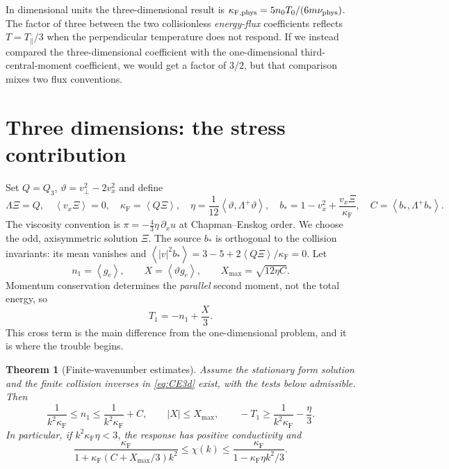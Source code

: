 \documentclass[11pt]{article}
\newcommand{\av}[1]{\left\langle #1\right\rangle}
\newcommand{\F}{\kappa_{\mathrm F}}
\newcommand{\dual}[1]{\left\langle #1,\Lambda^+ #1\right\rangle}
\newtheorem{theorem}{Theorem}[section]
\theoremstyle{definition}
\theoremstyle{remark}
\numberwithin{equation}{section}
\begin{document}
In dimensional units the three-dimensional result is
$\kappa_{\mathrm{F,phys}}=5n_0T_0/(6m\nu_{\rm phys})$.
The factor of three between the two collisionless \emph{energy-flux}
coefficients reflects $T=T_\parallel/3$ when the perpendicular
temperature does not respond. If we instead compared the
three-dimensional coefficient with the one-dimensional
third-central-moment coefficient, we would get a factor of $3/2$, but
that comparison mixes two flux conventions.

\section{Three dimensions: the stress contribution}\label{sec:3d}

Set $Q=Q_3$, $\vartheta=v_\perp^2-2v_x^2$ and define
\begin{equation}
 \Lambda\Xi=Q,\quad \av{v_x\Xi}=0,\quad
 \F=\av{Q\Xi},\quad
 \eta=\frac1{12}\dual{\vartheta},\quad
 b_*=1-v_x^2+\frac{v_x\Xi}{\F},\quad C=\dual{b_*}.
 \label{eq:CE3d}
\end{equation}
The viscosity convention is
$\pi=-\tfrac43\eta\,\partial_xu$ at Chapman--Enskog order.
We choose the odd, axisymmetric solution $\Xi$.
The source $b_*$ is orthogonal to the collision invariants:
its mean vanishes and
$\av{|v|^2b_*}=3-5+2\av{Q\Xi}/\F=0$.
Let
\[
 n_1=\av{g_e},\qquad X=\av{\vartheta g_e},\qquad
 X_{\max}=\sqrt{12\eta C}.
\]
Momentum conservation determines the \emph{parallel} second moment,
not the total energy, so
\begin{equation}
 T_1=-n_1+\frac X3.
 \label{eq:3dT}
\end{equation}
This cross term is the main difference from the one-dimensional problem,
and it is where the trouble begins.

\begin{theorem}[Finite-wavenumber estimates]\label{thm:3dbounds}
Assume the stationary form solution and the finite collision inverses in
\eqref{eq:CE3d} exist, with the tests below admissible. Then
\begin{equation}
 \frac1{k^2\F}\leq n_1\leq\frac1{k^2\F}+C,\qquad
 |X|\leq X_{\max},\qquad
 -T_1\geq\frac1{k^2\F}-\frac{\eta}{3}.
 \label{eq:nandT}
\end{equation}
In particular, if $k^2\F\eta<3$, the response has positive conductivity and
\begin{equation}
 \frac{\F}{1+\F(C+X_{\max}/3)k^2}
 \leq\chi(k)\leq
 \frac{\F}{1-\F\eta k^2/3}.
 \label{eq:3dbounds}
\end{equation}
\end{theorem}
\end{document}
